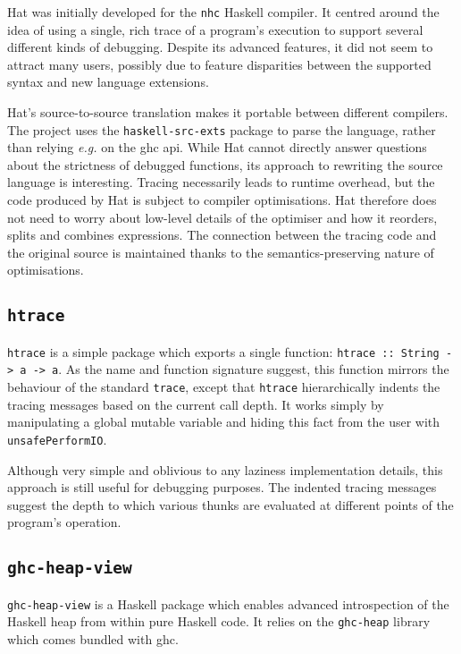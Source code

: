 \documentclass[thesis=B,english]{FITthesis}[2019/12/23]
\newcommand{\eg}{\emph{e.g.}\xspace}
\newcommand{\hackage}[1]{\texttt{#1}}
\newcommand{\hsIdent}[1]{\texttt{#1}}
\newcommand{\hsCode}[1]{\texttt{#1}}
\begin{document}
Hat was initially developed for the \texttt{nhc} Haskell
compiler\cite{hat-history}. It centred around the idea of using a single, rich
trace of a program's execution to support several different kinds of debugging.
Despite its advanced features, it did not seem to attract many
users\cite{hat-history}, possibly due to feature disparities between the
supported syntax and new language extensions.

Hat's source-to-source translation makes it portable between different
compilers. The project uses the \hackage{haskell-src-exts} package to parse the
language, rather than relying \eg on the \acrshort{ghc} \acrshort{api}. While
Hat cannot directly answer questions about the strictness of debugged
functions, its approach to rewriting the source language is interesting.
Tracing necessarily leads to runtime overhead, but the code produced by Hat is
subject to compiler optimisations. Hat therefore does not need to worry about
low-level details of the optimiser and how it reorders, splits and combines
expressions. The connection between the tracing code and the original source is
maintained thanks to the semantics-preserving nature of optimisations.


\subsection*{\hackage{htrace}} \label{sec:htrace}
\hackage{htrace} \cite{hkg-htrace} is a simple package which exports a single
function: \hsCode{htrace :: String -> a -> a}. As the name and function
signature suggest, this function mirrors the behaviour of the standard
\hsIdent{trace}, except that \hsIdent{htrace} hierarchically indents the
tracing messages based on the current call depth. It works simply by
manipulating a global mutable variable and hiding this fact from the user with
\hsIdent{unsafePerformIO}.

Although very simple and oblivious to any laziness implementation details, this
approach is still useful for debugging purposes. The indented tracing messages
suggest the depth to which various thunks are evaluated at different points of
the program's operation.

\subsection*{\hackage{ghc-heap-view}} \label{sec:ghc-heap-view}
\hackage{ghc-heap-view} is a Haskell package which enables advanced
introspection of the Haskell heap from within pure Haskell code. It relies on
the \hackage{ghc-heap} library which comes bundled with \acrshort{ghc}.
\end{document}
